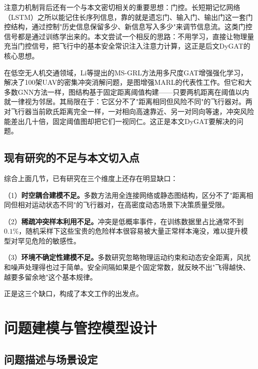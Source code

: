 \documentclass[12pt,a4paper,UTF8]{ctexart}
\begin{document}
注意力机制背后还有一个与本文密切相关的重要思想：门控。长短期记忆网络（LSTM）\cite{ref37}之所以能记住长序列信息，靠的就是遗忘门、输入门、输出门这一套门控结构，通过控制"历史信息保留多少、新信息写入多少"来调节信息流。这类门控信号都是通过训练学出来的。本文尝试一个相反的思路：不用学习，直接让物理量充当门控信号，把飞行中的基本安全常识注入注意力计算，这正是后文DyGAT的核心思想。

在低空无人机交通领域，Li等\cite{ref10}提出的MS-GRL方法用多尺度GAT增强强化学习，解决了100架UAV的密集冲突消解问题，是图增强MARL的代表性工作。但它和大多数GNN方法一样，图结构基于固定距离阈值构建——只要两机距离在阈值以内就一律视为邻居。其局限在于：它区分不了"距离相同但风险不同"的飞行器对。两对飞行器当前欧氏距离完全一样，一对相向高速靠近、另一对同向等速，冲突风险能差出几十倍，固定阈值图却把它们一视同仁。这正是本文DyGAT要解决的问题。

\subsection{现有研究的不足与本文切入点}

综合上面几节，已有研究在三个维度上还存在明显缺口：

（1）\textbf{时空耦合建模不足。}多数方法用全连接网络或静态图结构\cite{ref8,ref10,ref11}，区分不了"距离相同但相对运动状态不同"的飞行器对，在高密度动态场景下决策质量受限。

（2）\textbf{稀疏冲突样本利用不足。}冲突是低概率事件，在训练数据里占比通常不到$0.1\%$\cite{ref12,ref13}，随机采样下这些宝贵的危险样本很容易被大量正常样本淹没，难以提升模型对罕见危险的敏感性。

（3）\textbf{环境不确定性建模不足。}多数研究忽略物理运动约束和动态安全距离\cite{ref11}，风扰和噪声处理得也过于简单。安全间隔如果是个固定常数，就反映不出"飞得越快、越要多留余地"这个基本规律。

正是这三个缺口，构成了本文工作的出发点。

\section{问题建模与管控模型设计}

\subsection{问题描述与场景设定}
\end{document}
